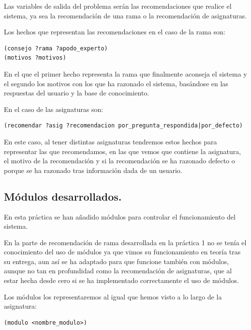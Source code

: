 \documentclass[12pt, spanish]{article}
\begin{document}
Las variables de salida del problema serán las recomendaciones que realice el sistema, ya sea la recomendación de una rama o la recomendación de asignaturas.

Los hechos que representan las recomendaciones en el caso de la rama son:

\begin{lstlisting}
(consejo ?rama ?apodo_experto)
(motivos ?motivos)
\end{lstlisting}

En el que el primer hecho representa la rama que finalmente aconseja el sistema y el segundo los motivos con los que ha razonado el sistema, basándose en las respuestas del usuario y la base de conocimiento.


En el caso de las asignaturas son:

\begin{lstlisting}
(recomendar ?asig ?recomendacion por_pregunta_respondida|por_defecto)
\end{lstlisting}

En este caso, al tener distintas asignaturas tendremos estos hechos para representar las que recomendamos, en las que vemos que contiene la asignatura, el motivo de la recomendación y si la recomendación se ha razonado defecto o porque se ha razonado tras información dada de un usuario.


\subsection{Módulos desarrollados.}

En esta práctica se han añadido módulos para controlar el funcionamiento del sistema.

En la parte de recomendación de rama desarrollada en la práctica 1 no se tenía el conocimiento del uso de módulos ya que vimos su funcionamiento en teoría tras su entrega, aun así se ha adaptado para que funcione también con módulos, aunque no tan en profundidad como la recomendación de asignaturas, que al estar hecha desde cero si se ha implementado correctamente el uso de módulos.

Los módulos los representaremos al igual que hemos visto a lo largo de la asignatura:

\begin{lstlisting}
(modulo <nombre_modulo>)
\end{lstlisting}
\end{document}
